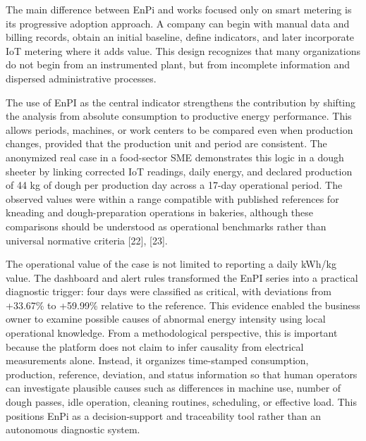 \documentclass{ieeeaccess}
\begin{document}
The main difference between EnPi and works focused only on smart metering is its progressive adoption approach. A company can begin with manual data and billing records, obtain an initial baseline, define indicators, and later incorporate IoT metering where it adds value. This design recognizes that many organizations do not begin from an instrumented plant, but from incomplete information and dispersed administrative processes.

The use of EnPI as the central indicator strengthens the contribution by shifting the analysis from absolute consumption to productive energy performance. This allows periods, machines, or work centers to be compared even when production changes, provided that the production unit and period are consistent. The anonymized real case in a food-sector SME demonstrates this logic in a dough sheeter by linking corrected IoT readings, daily energy, and declared production of 44 kg of dough per production day across a 17-day operational period. The observed values were within a range compatible with published references for kneading and dough-preparation operations in bakeries, although these comparisons should be understood as operational benchmarks rather than universal normative criteria [22], [23].

The operational value of the case is not limited to reporting a daily kWh/kg value. The dashboard and alert rules transformed the EnPI series into a practical diagnostic trigger: four days were classified as critical, with deviations from +33.67\% to +59.99\% relative to the reference. This evidence enabled the business owner to examine possible causes of abnormal energy intensity using local operational knowledge. From a methodological perspective, this is important because the platform does not claim to infer causality from electrical measurements alone. Instead, it organizes time-stamped consumption, production, reference, deviation, and status information so that human operators can investigate plausible causes such as differences in machine use, number of dough passes, idle operation, cleaning routines, scheduling, or effective load. This positions EnPi as a decision-support and traceability tool rather than an autonomous diagnostic system.
\end{document}
